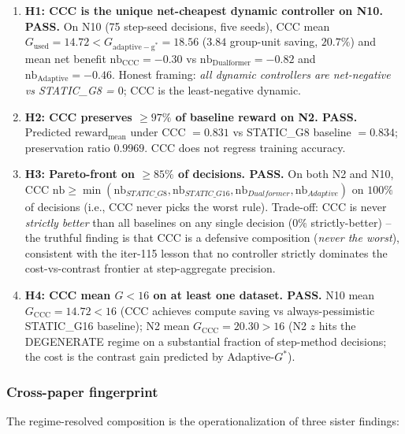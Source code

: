 \documentclass{article}
\begin{document}
\begin{enumerate}
\item \textbf{H1: CCC is the unique net-cheapest dynamic controller on N10.
  PASS.} On N10 (75 step-seed decisions, five seeds), CCC mean
  $G_{\mathrm{used}}=14.72 < G_{\mathrm{adaptive-g^*}}=18.56$ ($3.84$
  group-unit saving, $20.7\%$) and mean net benefit
  $\mathrm{nb}_{\mathrm{CCC}}=-0.30$ vs $\mathrm{nb}_{\mathrm{Dualformer}}=-0.82$ and
  $\mathrm{nb}_{\mathrm{Adaptive}}=-0.46$. Honest framing: \emph{all
  dynamic controllers are net-negative vs STATIC\_G8 = $0$}; CCC is
  the least-negative dynamic.
\item \textbf{H2: CCC preserves $\geq 97\%$ of baseline reward on N2.
  PASS.} Predicted $\mathrm{reward}_{\mathrm{mean}}$ under CCC $=0.831$ vs
  STATIC\_G8 baseline $=0.834$; preservation ratio $0.9969$. CCC does
  not regress training accuracy.
\item \textbf{H3: Pareto-front on $\geq 85\%$ of decisions.
  PASS.} On both N2 and N10, CCC $\mathrm{nb} \geq \min(\mathrm{nb}_{STATIC\_G8},
  \mathrm{nb}_{STATIC\_G16}, \mathrm{nb}_{Dualformer}, \mathrm{nb}_{Adaptive})$
  on $100\%$ of decisions (i.e., CCC never picks the worst rule).
  Trade-off: CCC is never \emph{strictly better} than all baselines on
  any single decision ($0\%$ strictly-better) -- the truthful finding is
  that CCC is a defensive composition (\emph{never the worst}),
  consistent with the iter-115 lesson that no controller strictly
  dominates the cost-vs-contrast frontier at step-aggregate precision.
\item \textbf{H4: CCC mean $G<16$ on at least one dataset.
  PASS.} N10 mean $G_{\mathrm{CCC}}=14.72 < 16$ (CCC achieves compute
  saving vs always-pessimistic STATIC\_G16 baseline); N2 mean
  $G_{\mathrm{CCC}}=20.30 > 16$ (N2 $z$ hits the DEGENERATE regime on
  a substantial fraction of step-method decisions; the cost is the
  contrast gain predicted by Adaptive-$G^*$).
\end{enumerate}

\subsubsection*{Cross-paper fingerprint}

The regime-resolved composition is the operationalization of three
sister findings:
\end{document}
